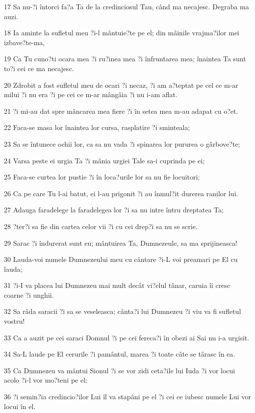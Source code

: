 \par 17 Sa nu-?i întorci fa?a Ta de la credinciosul Tau, când ma necajesc. Degraba ma auzi.
\par 18 Ia aminte la sufletul meu ?i-l mântuie?te pe el; din mâinile vrajma?ilor mei izbave?te-ma,
\par 19 Ca Tu cuno?ti ocara mea ?i ru?inea mea ?i înfruntarea mea; înaintea Ta sunt to?i cei ce ma necajesc.
\par 20 Zdrobit a fost sufletul meu de ocari ?i necaz, ?i am a?teptat pe cel ce m-ar milui ?i nu era ?i pe cei ce m-ar mângâia ?i nu i-am aflat.
\par 21 ?i mi-au dat spre mâncarea mea fiere ?i în setea mea m-au adapat cu o?et.
\par 22 Faca-se masa lor înaintea lor cursa, rasplatire ?i sminteala;
\par 23 Sa se întunece ochii lor, ca sa nu vada ?i spinarea lor pururea o gârbove?te;
\par 24 Varsa peste ei urgia Ta ?i mânia urgiei Tale sa-i cuprinda pe ei;
\par 25 Faca-se curtea lor pustie ?i în loca?urile lor sa nu fie locuitori;
\par 26 Ca pe care Tu l-ai batut, ei l-au prigonit ?i au înmul?it durerea ranilor lui.
\par 27 Adauga faradelege la faradelegea lor ?i sa nu intre întru dreptatea Ta;
\par 28 ?ter?i sa fie din cartea celor vii ?i cu cei drep?i sa nu se scrie.
\par 29 Sarac ?i îndurerat sunt eu; mântuirea Ta, Dumnezeule, sa ma sprijineasca!
\par 30 Lauda-voi numele Dumnezeului meu cu cântare ?i-L voi preamari pe El cu lauda;
\par 31 ?i-I va placea lui Dumnezeu mai mult decât vi?elul tânar, caruia îi cresc coarne ?i unghii.
\par 32 Sa râda saracii ?i sa se veseleasca; cânta?i lui Dumnezeu ?i viu va fi sufletul vostru!
\par 33 Ca a auzit pe cei saraci Domnul ?i pe cei fereca?i în obezi ai Sai nu i-a urgisit.
\par 34 Sa-L laude pe El cerurile ?i pamântul, marea ?i toate câte se târasc în ea.
\par 35 Ca Dumnezeu va mântui Sionul ?i se vor zidi ceta?ile lui Iuda ?i vor locui acolo ?i-l vor mo?teni pe el;
\par 36 ?i semin?ia credincio?ilor Lui îl va stapâni pe el ?i cei ce iubesc numele Lui vor locui în el.

